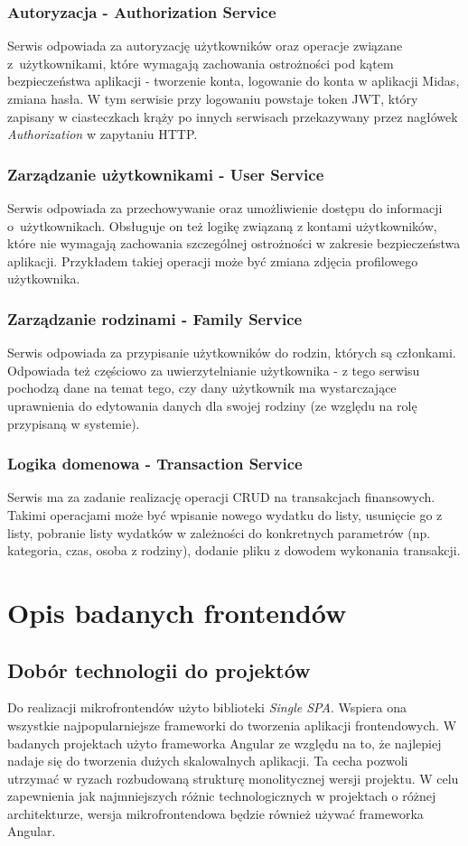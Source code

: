 \documentclass{SGGW-thesis}
\begin{document}
\subsection{Autoryzacja - Authorization Service}
Serwis odpowiada za autoryzację użytkowników oraz operacje związane z~użytkownikami, które wymagają zachowania ostrożności pod kątem bezpieczeństwa aplikacji - tworzenie konta, logowanie do konta w aplikacji Midas, zmiana hasła. W tym serwisie przy logowaniu powstaje token JWT, który zapisany w ciasteczkach krąży po innych serwisach przekazywany przez nagłówek \textit{Authorization} w zapytaniu HTTP.

\subsection{Zarządzanie użytkownikami - User Service}
Serwis odpowiada za przechowywanie oraz umożliwienie dostępu do informacji o~użytkownikach. Obsługuje on też logikę związaną z kontami użytkowników, które nie wymagają zachowania szczególnej ostrożności w zakresie bezpieczeństwa aplikacji. Przykładem takiej operacji może być zmiana zdjęcia profilowego użytkownika.

\subsection{Zarządzanie rodzinami - Family Service}
Serwis odpowiada za przypisanie użytkowników do rodzin, których są członkami. Odpowiada też częściowo za uwierzytelnianie użytkownika - z tego serwisu pochodzą dane na temat tego, czy dany użytkownik ma wystarczające uprawnienia do edytowania danych dla swojej rodziny (ze względu na rolę przypisaną w systemie).

\subsection{Logika domenowa - Transaction Service}
Serwis ma za zadanie realizację operacji CRUD na transakcjach finansowych. Takimi operacjami może być wpisanie nowego wydatku do listy, usunięcie go z listy, pobranie listy wydatków w zależności do konkretnych parametrów (np. kategoria, czas, osoba z rodziny), dodanie pliku z dowodem wykonania transakcji.

\chapter{Opis badanych frontendów}
\section{Dobór technologii do projektów}
Do realizacji mikrofrontendów użyto biblioteki \textit{Single SPA}. Wspiera ona wszystkie najpopularniejsze frameworki do tworzenia aplikacji frontendowych. W badanych projektach użyto frameworka Angular ze względu na to, że najlepiej nadaje się do tworzenia dużych skalowalnych aplikacji. Ta cecha pozwoli utrzymać w ryzach rozbudowaną strukturę monolitycznej wersji projektu. W celu zapewnienia jak najmniejszych różnic technologicznych w projektach o różnej architekturze, wersja mikrofrontendowa będzie również używać frameworka Angular.
\end{document}
